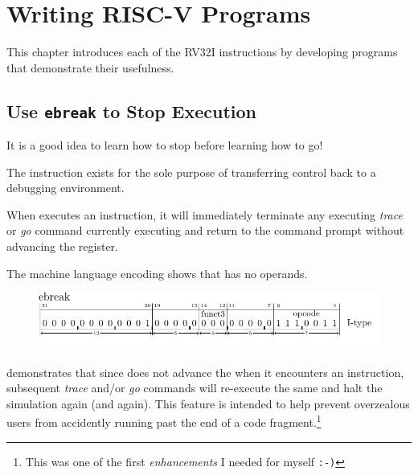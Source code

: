 \chapter{Writing RISC-V Programs}

%
This chapter introduces each of the RV32I instructions by developing programs
that demonstrate their usefulness.

\section{Use \texttt{ebreak} to Stop \rvddt{} Execution}
\label{uguide:ebreak}

It is a good idea to learn how to stop before learning how to go!

The  instruction exists for the sole purpose of transferring control back
to a debugging environment.\cite[p.~24]{rvismv1v22:2017}

When \rvddt{} executes an  instruction, it will immediately terminate any
executing {\em trace} or {\em go} command currently executing and return to the
command prompt without advancing the  register.

The machine language encoding shows that  has no operands.

\begin{figure}[H]
    \includegraphics{figures/chapter04/ITypeEbreak.pdf}
\end{figure}

 demonstrates that since \rvddt{} does
not advance the  when it encounters an  instruction,
subsequent {\em trace} and/or {\em go} commands will re-execute the same 
and halt the simulation again (and again).
This feature is intended to help prevent overzealous users from accidently
running past the end of a code fragment.\footnote{This was one of the first {\em enhancements}
I needed for myself \tt:-)}




